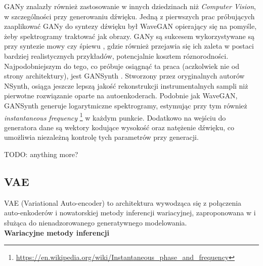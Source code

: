 \documentclass[magisterska]{pracamgr}
\begin{document}
GANy znalazły również zastosowanie w innych dziedzinach niż \textit{Computer Vision}, w szczególności przy generowaniu dźwięku. Jedną z pierwszych prac próbujących zaaplikować GANy do syntezy dźwięku był WaveGAN \cite{donahue2019wavegan} opierający się na pomyśle, żeby spektrogramy traktować jak obrazy. GANy są sukcesem wykorzystywane są przy syntezie mowy \cite{kumar2019melgan} \cite{donahue2021endtoend} czy śpiewu \cite{sankaran2021anyonegansing}, gdzie również przejawia się ich zaleta w postaci bardziej realistycznych przykładów, potencjalnie kosztem róznorodności. Najpodobniejszym do tego, co próbuje osiągnąć ta praca (aczkolwiek nie od strony architektury), jest GANSynth \cite{engel2019gansynth}. Stworzony przez oryginalnych autorów NSynth, osiąga jeszcze lepszą jakość rekonstrukcji instrumentalnych sampli niż pierwotne rozwiązanie oparte na autoenkoderach. Podobnie jak WaveGAN, GANSynth generuje logarytmiczne spektrogramy, estymując przy tym również \textit{instantaneous frequency} \footnote{\url{https://en.wikipedia.org/wiki/Instantaneous_phase_and_frequency}} w każdym punkcie. Dodatkowo na wejściu do generatora dane są wektory kodujące wysokość oraz natężenie dźwięku, co umożliwia niezależną kontrolę tych parametrów przy generacji. 

TODO: anything more?


\subsection{VAE}

VAE (Variational Auto-encoder) to architektura wywodząca się z połączenia auto-enkoderów i nowatorskiej metody inferencji wariacyjnej, zaproponowana w \cite{kingma2014autoencoding} i służąca do nienadzorowanego generatywnego modelowania. \\

\noindent \textbf{Wariacyjne metody inferencji} \\
\end{document}
